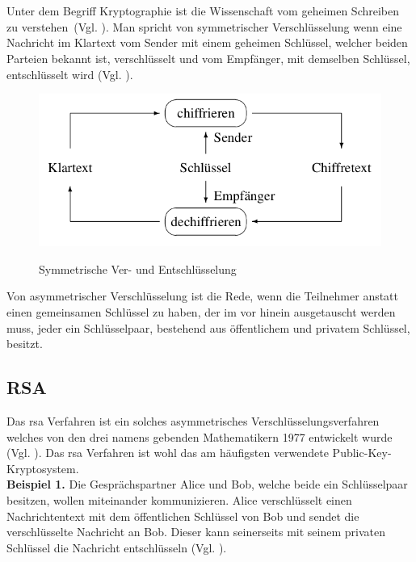 \section{
}
	\glqq Unter dem Begriff Kryptographie ist die Wissenschaft vom geheimen Schreiben zu verstehen\grqq~(Vgl. \cite[S. 1]{kryptographie}). Man spricht von symmetrischer Verschlüsselung wenn eine Nachricht im Klartext vom Sender mit einem geheimen Schlüssel, welcher beiden Parteien bekannt ist, verschlüsselt und vom Empfänger, mit demselben Schlüssel, entschlüsselt wird (Vgl. \cite[S. 1]{kryptographie}).
	\begin{figure}[h]
		\begin{minipage}{\textwidth}
			\centering
			\includegraphics[scale=0.5]{figures/ver-und-entschluesseln.png}
			\label{fig:ver-und-entschluesselung}
			\caption{Symmetrische Ver- und Entschlüsselung}
		\end{minipage}
	\end{figure}
	Von asymmetrischer Verschlüsselung ist die Rede, wenn die Teilnehmer anstatt einen gemeinsamen Schlüssel zu haben, der im vor hinein ausgetauscht werden muss, jeder ein Schlüsselpaar, bestehend aus öffentlichem und privatem Schlüssel, besitzt.\\
	\subsection{RSA}
	Das \gls{rsa} Verfahren ist ein solches asymmetrisches Verschlüsselungsverfahren welches von den drei namens gebenden Mathematikern 1977 entwickelt wurde (Vgl. \cite[S. 77]{kryptographie}). Das \gls{rsa} Verfahren ist wohl das am häufigsten verwendete Public-Key-Kryptosystem.\\
	
	\textbf{Beispiel 1.} Die Gesprächspartner Alice und Bob, welche beide ein Schlüsselpaar besitzen, wollen miteinander kommunizieren. Alice verschlüsselt einen Nachrichtentext mit dem öffentlichen Schlüssel von Bob und sendet die verschlüsselte Nachricht an Bob. Dieser kann seinerseits mit seinem privaten Schlüssel die Nachricht entschlüsseln (Vgl. \cite[S. 73 f.]{kryptographie}).\\
